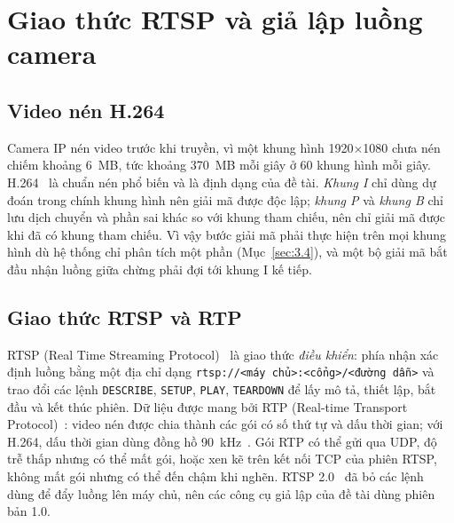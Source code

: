 \section{Giao thức RTSP và giả lập luồng camera}
\label{sec:3.7}

\subsection{Video nén H.264}
\label{sec:3.7.1}

Camera IP nén video trước khi truyền, vì một khung hình 1920$\times$1080 chưa nén chiếm khoảng 6~MB, tức khoảng 370~MB mỗi giây ở 60 khung hình mỗi giây. H.264~\cite{wiegand2003h264} là chuẩn nén phổ biến và là định dạng của đề tài. \emph{Khung I} chỉ dùng dự đoán trong chính khung hình nên giải mã được độc lập; \emph{khung P} và \emph{khung B} chỉ lưu dịch chuyển và phần sai khác so với khung tham chiếu, nên chỉ giải mã được khi đã có khung tham chiếu. Vì vậy bước giải mã phải thực hiện trên mọi khung hình dù hệ thống chỉ phân tích một phần (Mục~\ref{sec:3.4}), và một bộ giải mã bắt đầu nhận luồng giữa chừng phải đợi tới khung I kế tiếp.

\subsection{Giao thức RTSP và RTP}
\label{sec:3.7.2}

RTSP (Real Time Streaming Protocol)~\cite{rfc2326} là giao thức \emph{điều khiển}: phía nhận xác định luồng bằng một địa chỉ dạng \texttt{rtsp://<máy chủ>:<cổng>/<đường dẫn>} và trao đổi các lệnh \texttt{DESCRIBE}, \texttt{SETUP}, \texttt{PLAY}, \texttt{TEARDOWN} để lấy mô tả, thiết lập, bắt đầu và kết thúc phiên. Dữ liệu được mang bởi RTP (Real-time Transport Protocol)~\cite{rfc3550}: video nén được chia thành các gói có số thứ tự và dấu thời gian; với H.264, dấu thời gian dùng đồng hồ 90~kHz~\cite{rfc6184}. Gói RTP có thể gửi qua UDP, độ trễ thấp nhưng có thể mất gói, hoặc xen kẽ trên kết nối TCP của phiên RTSP, không mất gói nhưng có thể đến chậm khi nghẽn. RTSP 2.0~\cite{rfc7826} đã bỏ các lệnh dùng để đẩy luồng lên máy chủ, nên các công cụ giả lập của đề tài dùng phiên bản 1.0.

